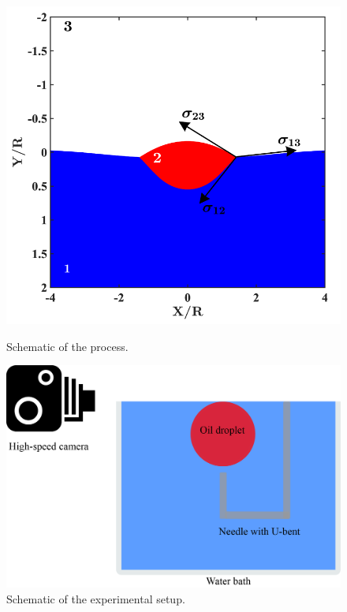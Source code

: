 \documentclass[a4paper,10pt]{article}
\begin{document}
\begin{figure}[H]
    \centering
    \begin{minipage}{0.39\textwidth}
        \begin{center}
        \includegraphics[width=\linewidth]{Schematic}
        \caption{Schematic of the process.}
        \label{Figure:Schematic}
        \end{center}
    \end{minipage}
    \begin{minipage}{0.55\textwidth}
        \begin{center}
        \includegraphics[width=\linewidth]{Experimental_Setup.png}
        \caption{Schematic of the experimental setup.}
        \label{Figure::Experimental}
        \end{center}
    \end{minipage}
\end{figure}
\end{document}
